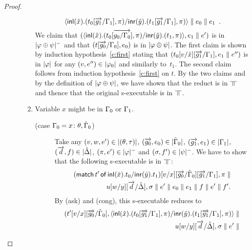 \begin{proof}
\begin{description}
\begin{enumerate}[label=\textit{(\arabic{*})}]
\[              \langle \mathsf{inl}({\hat{x}}). ({t_0[\overrightarrow{g_1}/\Gamma_1]},{\pi})/ \mathsf{inr}({\hat{y}}). ({t_1[\overrightarrow{g_1}/\Gamma_1]},{\pi})\rangle\parallel{e_0}\parallel
              {e_1}\enspace.
              \]
              We claim that
              $(\langle \mathsf{inl}({\hat{x}}). ({t_0[\overrightarrow{g_0/\Gamma_0}]},{\pi})/ \mathsf{inr}({\hat{y}}). ({t_1},{\pi})\rangle,{e_1}\parallel
              e')$ is in $|{\varphi\oplus\psi}|^-$ and that
              $(t[\overrightarrow{g_0}/\Gamma_0],{e_0})$ is in $|{\varphi\oplus\psi}|$.  The first
              claim is shown by induction hypothesis~\ref{c:first}
              stating that $(t_0[v/\hat{x}][\overrightarrow{g_1}/\Gamma_1], {e_1}\parallel
              e'')$ is in $|{\varphi}|$ for any $(v,e'')\in|{\varphi_0}|$
              and similarly to~$t_1$.
              The second claim follows from induction
              hypothesis~\ref{c:first} on $t$.
              By the two claims and by the definition of
              $|{\varphi\oplus\psi}|$,
              we have shown that the reduct is in $\bbot$ and
              thence that the original s-executable is in $\bbot$.
        \item Variable $x$ might be in $\Gamma_0$ or $\Gamma_1$.
              \begin{description}
               \item[(case $\Gamma_0 = {x} \colon{\theta},\hat{\Gamma}_0$)]
                    Take any
                    $(v,w,e')\in|{(\theta,\tau)}|$,
                    $(\overrightarrow{g_0},{e_0})\in|{\hat{\Gamma}_0}|$,
                    $(\overrightarrow{g_1},{e_1})\in|{\Gamma_1}|$,
                    $(\overrightarrow d, f)\in|{\hat{\Delta}}|$,
                    $(\pi,e')\in|{\varphi}|^-$ and
                    $(\sigma,f')\in|{\psi}|^-$.
                    We have to show that the following s-executable is in
                    $\bbot$:
                    \begin{eqnarray*}
                    (\mathsf{match}\,{t'}\,\mathsf{of}\, \mathsf{inl}({\hat x}). {t_0}/ \mathsf{inr}({\hat
                    y}). {t_1})[v/x][\overrightarrow{g_0}/\hat{\Gamma}_0][\overrightarrow{g_1}/\Gamma_1],\pi\parallel\\
                    u[w/y][\overrightarrow d/\hat{\Delta}],\sigma\parallel e'\parallel
                    {e_0}\parallel {e_1}\parallel  f\parallel e'\parallel
                    f'.
                    \end{eqnarray*}
                    By (ask) and (cong), this s-executable reduces to
                    \begin{eqnarray*}
                    (t'[v/x][\vec{g_0}/\hat\G_0],
                     \mats{\hat x}{t_0[\vec{g_1}/\G_1]}{\pi}{\hat y}{t_1[\vec{g_1}/\G_1]}{\pi}
                     \conc\\
                    u[w/y][\vec d/\hat\D],\sigma\conc e'\conc

\end{eqnarray*}
\end{description}
\end{enumerate}
\end{description}
\end{proof}
